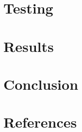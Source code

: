 \documentclass[a4paper, 12pt]{article}
\begin{document}
\newpage
\section{Testing}



\newpage
\section{Results}



\newpage
\section{Conclusion}



\newpage
\section{References}
\end{document}
